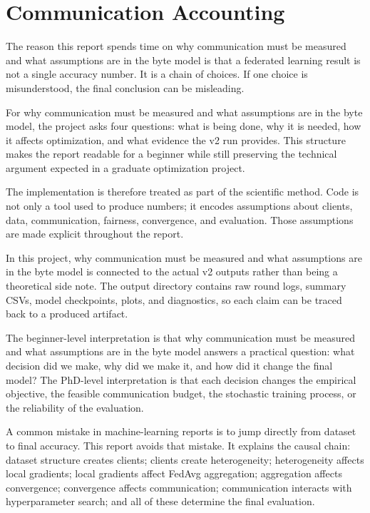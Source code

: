\documentclass[11pt]{report}
\begin{document}
\chapter{Communication Accounting}
The reason this report spends time on why communication must be measured and what assumptions are in
the byte model is that a federated learning result is not a single accuracy number. It is a chain of
choices. If one choice is misunderstood, the final conclusion can be misleading.

For why communication must be measured and what assumptions are in the byte model, the project asks
four questions: what is being done, why it is needed, how it affects optimization, and what evidence
the v2 run provides. This structure makes the report readable for a beginner while still preserving
the technical argument expected in a graduate optimization project.

The implementation is therefore treated as part of the scientific method. Code is not only a tool
used to produce numbers; it encodes assumptions about clients, data, communication, fairness,
convergence, and evaluation. Those assumptions are made explicit throughout the report.

In this project, why communication must be measured and what assumptions are in the byte model is
connected to the actual v2 outputs rather than being a theoretical side note. The output directory
contains raw round logs, summary CSVs, model checkpoints, plots, and diagnostics, so each claim can
be traced back to a produced artifact.

The beginner-level interpretation is that why communication must be measured and what assumptions
are in the byte model answers a practical question: what decision did we make, why did we make it,
and how did it change the final model? The PhD-level interpretation is that each decision changes
the empirical objective, the feasible communication budget, the stochastic training process, or the
reliability of the evaluation.

A common mistake in machine-learning reports is to jump directly from dataset to final accuracy.
This report avoids that mistake. It explains the causal chain: dataset structure creates clients;
clients create heterogeneity; heterogeneity affects local gradients; local gradients affect FedAvg
aggregation; aggregation affects convergence; convergence affects communication; communication
interacts with hyperparameter search; and all of these determine the final evaluation.
\end{document}
